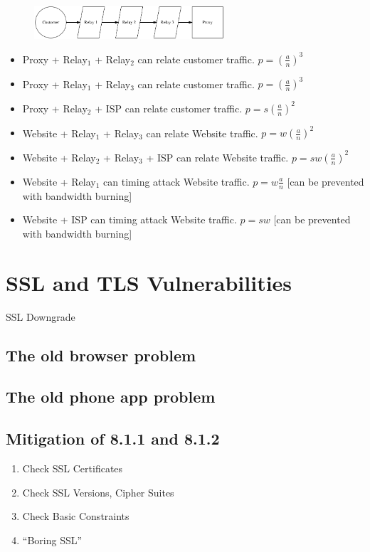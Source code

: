 \documentclass{article}
\begin{document}
\begin{figure}[htbp]
  \centering
  \includegraphics[width = 200pt]{stttc}
  \caption{}
\end{figure}

\begin{itemize}
\item Proxy + Relay$_1$ + Relay$_2$ can relate customer traffic. $p = (\frac{a}{n})^3$
\item Proxy + Relay$_1$ + Relay$_3$ can relate customer traffic. $p = (\frac{a}{n})^3$
\item Proxy + Relay$_2$ + ISP can relate customer traffic. $p = s(\frac{a}{n})^2$
\item Website + Relay$_1$ + Relay$_3$ can relate Website traffic. $p = w(\frac{a}{n})^2$
\item Website + Relay$_2$ + Relay$_3$ + ISP can relate Website traffic. $p = sw(\frac{a}{n})^2$
\item Website + Relay$_1$ can timing attack Website traffic. $p = w\frac{a}{n}$ [can be prevented with bandwidth burning]
\item Website + ISP can timing attack Website traffic. $p = sw$ [can be prevented with bandwidth burning]
\end{itemize}


\section{SSL and TLS Vulnerabilities}

SSL Downgrade

\subsection{The old browser problem}

\subsection{The old phone app problem}

\subsection{Mitigation of 8.1.1 and 8.1.2}

\begin{enumerate}
    \item Check SSL Certificates
    \item Check SSL Versions, Cipher Suites
    \item Check Basic Constraints
    \item “Boring SSL”
\end{enumerate}
\end{document}
